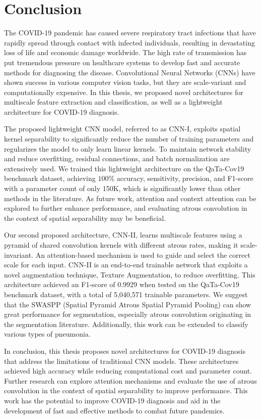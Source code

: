 \section{Conclusion}
The COVID-19 pandemic has caused severe respiratory tract infections that have rapidly spread through contact with infected individuals, resulting in devastating loss of life and economic damage worldwide. The high rate of transmission has put tremendous pressure on healthcare systems to develop fast and accurate methods for diagnosing the disease. Convolutional Neural Networks (CNNs) have shown success in various computer vision tasks, but they are scale-variant and computationally expensive. In this thesis, we proposed novel architectures for multiscale feature extraction and classification, as well as a lightweight architecture for COVID-19 diagnosis.

The proposed lightweight CNN model, referred to as CNN-I, exploits spatial kernel separability to significantly reduce the number of training parameters and regularizes the model to only learn linear kernels. To maintain network stability and reduce overfitting, residual connections, and batch normalization are extensively used. We trained this lightweight architecture on the QaTa-Cov19 benchmark dataset, achieving $100\%$ accuracy, sensitivity, precision, and F1-score with a parameter count of only 150K, which is significantly lower than other methods in the literature. As future work, attention and context attention can be explored to further enhance performance, and evaluating atrous convolution in the context of spatial separability may be beneficial.

Our second proposed architecture, CNN-II, learns multiscale features using a pyramid of shared convolution kernels with different atrous rates, making it scale-invariant. An attention-based mechanism is used to guide and select the correct scale for each input. CNN-II is an end-to-end trainable network that exploits a novel augmentation technique, Texture Augmentation, to reduce overfitting. This architecture achieved an F1-score of 0.9929 when tested on the QaTa-Cov19 benchmark dataset, with a total of 5,040,571 trainable parameters. We suggest that the SWASPP (Spatial Pyramid Atrous Spatial Pyramid Pooling) can show great performance for segmentation, especially atrous convolution originating in the segmentation literature. Additionally, this work can be extended to classify various types of pneumonia.

In conclusion, this thesis proposes novel architectures for COVID-19 diagnosis that address the limitations of traditional CNN models. These architectures achieved high accuracy while reducing computational cost and parameter count. Further research can explore attention mechanisms and evaluate the use of atrous convolution in the context of spatial separability to improve performance. This work has the potential to improve COVID-19 diagnosis and aid in the development of fast and effective methods to combat future pandemics.

